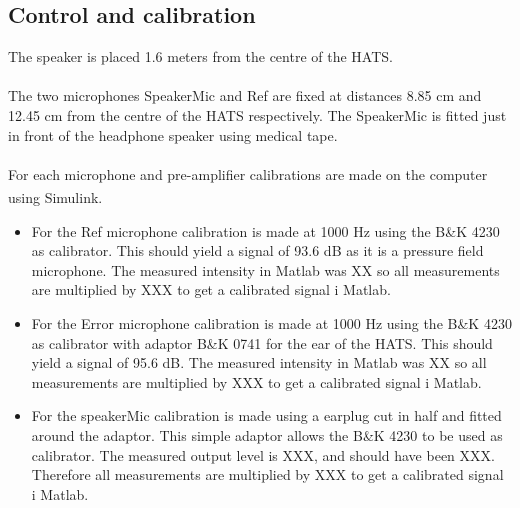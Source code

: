 \subsection{Control and calibration}
The speaker is placed 1.6 meters from the centre of the HATS. \\\\
The two microphones SpeakerMic and Ref are fixed at distances 8.85 cm and 12.45 cm from the centre of the HATS respectively. The SpeakerMic is fitted just in front of the headphone speaker using medical tape.\\\\
For each microphone and pre-amplifier calibrations are made on the computer using Simulink\textsuperscript{\textregistered}.
\begin{itemize}
	\item For the Ref microphone calibration is made at 1000 Hz using the B\&K 4230 as calibrator. This should yield a signal of 93.6 dB as it is a pressure field microphone. The measured intensity in Matlab was XX so all measurements are multiplied by XXX to get a calibrated signal i Matlab. 
	\item For the Error microphone calibration is made at 1000 Hz using the B\&K 4230 as calibrator with adaptor B\&K 0741 for the ear of the HATS. This should yield a signal of 95.6 dB. The measured intensity in Matlab was XX so all measurements are multiplied by XXX to get a calibrated signal i Matlab. 
	\item For the speakerMic calibration is made using a earplug cut in half and fitted around the adaptor. This simple adaptor allows the B\&K 4230 to be used as calibrator. The measured output level is XXX, and should have been XXX. Therefore all measurements are multiplied by XXX to get a calibrated signal i Matlab. 
\end{itemize}
 
